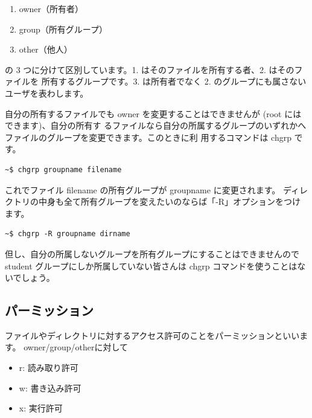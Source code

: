 \documentclass[a4j]{ltjreport}
\begin{document}
    \begin{enumerate}
        \item owner（所有者）
        \item group（所有グループ）
        \item other（他人）
    \end{enumerate}
    の 3 つに分けて区別しています。1. はそのファイルを所有する者、2. はそのファイルを
    所有するグループです。3. は所有者でなく 2. のグループにも属さないユーザを表わします。

    自分の所有するファイルでも owner を変更することはできませんが (root にはできます)、自分の所有す
    るファイルなら自分の所属するグループのいずれかへファイルのグループを変更できます。このときに利
    用するコマンドは chgrp です。

    \vspace*{1mm}
    \begin{lstlisting}[numbers=none]
        ~$ chgrp groupname filename
    \end{lstlisting}
    \vspace*{1mm}

    これでファイル filename の所有グループが groupname に変更されます。
    ディレクトリの中身も全て所有グループを変えたいのならば「-R」オプションをつけます。

    \vspace*{1mm}
    \begin{lstlisting}[numbers=none]
        ~$ chgrp -R groupname dirname
    \end{lstlisting}
    \vspace*{1mm}

    但し、自分の所属しないグループを所有グループにすることはできませんので 
    student グループにしか所属していない皆さんは chgrp コマンドを使うことはないでしょう。

    \subsection{パーミッション}
    ファイルやディレクトリに対するアクセス許可のことをパーミッションといいます。
    owner/group/otherに対して

    \begin{itemize}
        \item r:  読み取り許可
        \item w:  書き込み許可
        \item x:  実行許可
    \end{itemize}
\end{document}

